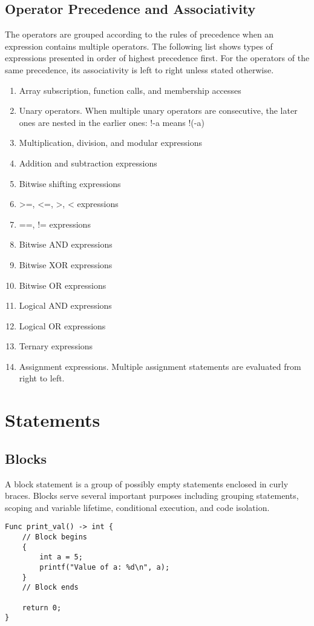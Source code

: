 \documentclass[11pt,A4]{article}
\begin{document}
        \subsection{Operator Precedence and Associativity}
        The operators are grouped according to the rules of precedence when an expression contains multiple operators. The following list shows types of expressions presented in order of highest precedence first. For the operators of the same precedence, its associativity is left to right unless stated otherwise.
        \begin{enumerate}
            \item Array subscription, function calls, and membership accesses
            \item Unary operators. When multiple unary operators are consecutive, the later ones are nested in the earlier ones: !-a means !(-a)
            \item Multiplication, division, and modular expressions
            \item Addition and subtraction expressions
            \item Bitwise shifting expressions
            \item >=, <=, >, < expressions
            \item ==, != expressions
            \item Bitwise AND expressions
            \item Bitwise XOR expressions
            \item Bitwise OR expressions
            \item Logical AND expressions
            \item Logical OR expressions
            \item Ternary expressions
            \item Assignment expressions. Multiple assignment statements are evaluated from right to left. 
        \end{enumerate}

    \newpage
    \section{Statements}
        \subsection{Blocks}
        A block statement is a group of possibly empty statements enclosed in curly braces. Blocks serve several important purposes including grouping statements, scoping and variable lifetime, conditional execution, and code isolation.
        \begin{lstlisting}
Func print_val() -> int {
    // Block begins
    {
        int a = 5;
        printf("Value of a: %d\n", a);
    }
    // Block ends

    return 0;
}
        \end{lstlisting}
        
\end{document}
